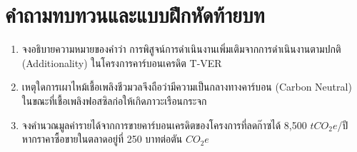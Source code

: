 \section{คำถามทบทวนและแบบฝึกหัดท้ายบท}
\begin{enumerate}
    \item จงอธิบายความหมายของคำว่า การพิสูจน์การดำเนินงานเพิ่มเติมจากการดำเนินงานตามปกติ (Additionality) ในโครงการคาร์บอนเครดิต T-VER
    \item เหตุใดการเผาไหม้เชื้อเพลิงชีวมวลจึงถือว่ามีความเป็นกลางทางคาร์บอน (Carbon Neutral) ในขณะที่เชื้อเพลิงฟอสซิลก่อให้เกิดภาวะเรือนกระจก
    \item จงคำนวณมูลค่ารายได้จากการขายคาร์บอนเครดิตของโครงการที่ลดก๊าซได้ 8,500 $tCO_2e$/ปี หากราคาซื้อขายในตลาดอยู่ที่ 250 บาทต่อตัน $CO_2e$
\end{enumerate}
